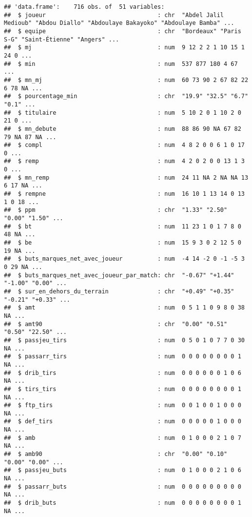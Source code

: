 \documentclass[7pt,]{report}
\begin{document}
\begin{verbatim}
## 'data.frame':    716 obs. of  51 variables:
##  $ joueur                                : chr  "Abdel Jalil Medioub" "Abdou Diallo" "Abdoulaye Bakayoko" "Abdoulaye Bamba" ...
##  $ equipe                                : chr  "Bordeaux" "Paris S-G" "Saint-Étienne" "Angers" ...
##  $ mj                                    : num  9 12 2 2 1 10 15 1 24 0 ...
##  $ min                                   : num  537 877 180 4 67 ...
##  $ mn_mj                                 : num  60 73 90 2 67 82 22 6 78 NA ...
##  $ pourcentage_min                       : chr  "19.9" "32.5" "6.7" "0.1" ...
##  $ titulaire                             : num  5 10 2 0 1 10 2 0 21 0 ...
##  $ mn_debute                             : num  88 86 90 NA 67 82 79 NA 87 NA ...
##  $ compl                                 : num  4 8 2 0 0 6 1 0 17 0 ...
##  $ remp                                  : num  4 2 0 2 0 0 13 1 3 0 ...
##  $ mn_remp                               : num  24 11 NA 2 NA NA 13 6 17 NA ...
##  $ rempne                                : num  16 10 1 13 14 0 13 1 0 18 ...
##  $ ppm                                   : chr  "1.33" "2.50" "0.00" "1.50" ...
##  $ bt                                    : num  11 23 1 0 1 7 8 0 48 NA ...
##  $ be                                    : num  15 9 3 0 2 12 5 0 19 NA ...
##  $ buts_marques_net_avec_joueur          : num  -4 14 -2 0 -1 -5 3 0 29 NA ...
##  $ buts_marques_net_avec_joueur_par_match: chr  "-0.67" "+1.44" "-1.00" "0.00" ...
##  $ sur_en_dehors_du_terrain              : chr  "+0.49" "+0.35" "-0.21" "+0.33" ...
##  $ amt                                   : num  0 5 1 1 0 9 8 0 38 NA ...
##  $ amt90                                 : chr  "0.00" "0.51" "0.50" "22.50" ...
##  $ passjeu_tirs                          : num  0 5 0 1 0 7 7 0 30 NA ...
##  $ passarr_tirs                          : num  0 0 0 0 0 0 0 0 1 NA ...
##  $ drib_tirs                             : num  0 0 0 0 0 0 1 0 6 NA ...
##  $ tirs_tirs                             : num  0 0 0 0 0 0 0 0 1 NA ...
##  $ ftp_tirs                              : num  0 0 1 0 0 1 0 0 0 NA ...
##  $ def_tirs                              : num  0 0 0 0 0 1 0 0 0 NA ...
##  $ amb                                   : num  0 1 0 0 0 2 1 0 7 NA ...
##  $ amb90                                 : chr  "0.00" "0.10" "0.00" "0.00" ...
##  $ passjeu_buts                          : num  0 1 0 0 0 2 1 0 6 NA ...
##  $ passarr_buts                          : num  0 0 0 0 0 0 0 0 0 NA ...
##  $ drib_buts                             : num  0 0 0 0 0 0 0 0 1 NA ...

\end{verbatim}
\end{document}
